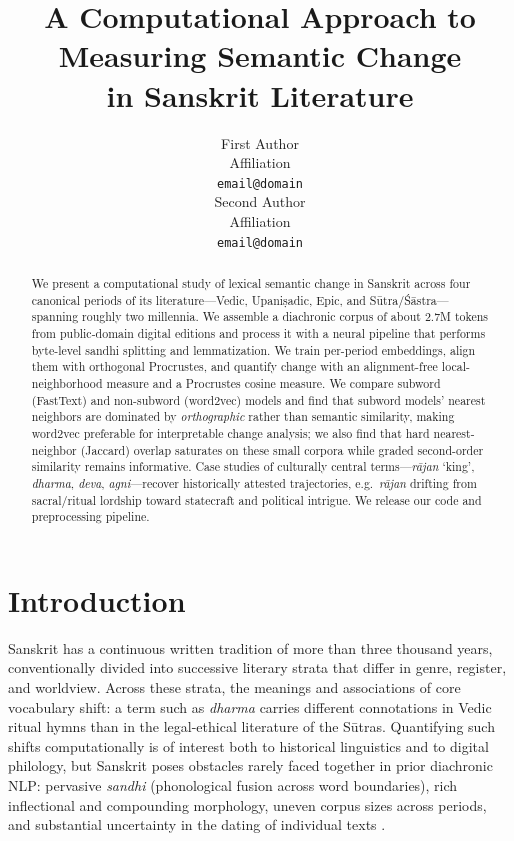 \documentclass[11pt]{article}
\title{A Computational Approach to Measuring Semantic Change\\ in Sanskrit Literature}
\author{First Author \\
  Affiliation \\
  \texttt{email@domain} \\\And
  Second Author \\
  Affiliation \\
  \texttt{email@domain} \\}
\begin{document}
\maketitle

\begin{abstract}
We present a computational study of lexical semantic change in Sanskrit across four canonical periods of its literature---Vedic, Upani\d{s}adic, Epic, and S\=utra/\'S\=astra---spanning roughly two millennia. We assemble a diachronic corpus of about 2.7M tokens from public-domain digital editions and process it with a neural pipeline that performs byte-level sandhi splitting and lemmatization. We train per-period embeddings, align them with orthogonal Procrustes, and quantify change with an alignment-free local-neighborhood measure and a Procrustes cosine measure. We compare subword (FastText) and non-subword (word2vec) models and find that subword models' nearest neighbors are dominated by \emph{orthographic} rather than semantic similarity, making word2vec preferable for interpretable change analysis; we also find that hard nearest-neighbor (Jaccard) overlap saturates on these small corpora while graded second-order similarity remains informative. Case studies of culturally central terms---\textit{r\=ajan} `king', \textit{dharma}, \textit{deva}, \textit{agni}---recover historically attested trajectories, e.g.\ \textit{r\=ajan} drifting from sacral/ritual lordship toward statecraft and political intrigue. We release our code and preprocessing pipeline.
\end{abstract}

\section{Introduction}

Sanskrit has a continuous written tradition of more than three thousand years, conventionally divided into successive literary strata that differ in genre, register, and worldview. Across these strata, the meanings and associations of core vocabulary shift: a term such as \textit{dharma} carries different connotations in Vedic ritual hymns than in the legal-ethical literature of the S\=utras. Quantifying such shifts computationally is of interest both to historical linguistics and to digital philology, but Sanskrit poses obstacles rarely faced together in prior diachronic NLP: pervasive \textit{sandhi} (phonological fusion across word boundaries), rich inflectional and compounding morphology, uneven corpus sizes across periods, and substantial uncertainty in the dating of individual texts \citep{hellwig2020treebank}.
\end{document}
